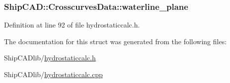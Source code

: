 \subsubsection[{\texorpdfstring{waterline\+\_\+plane}{waterline_plane}}]{ Ship\+C\+A\+D\+::\+Crosscurves\+Data\+::waterline\+\_\+plane}\hypertarget{structShipCAD_1_1CrosscurvesData_a1ea6de1b52289e8392e8d499ae4aad04}{}\label{structShipCAD_1_1CrosscurvesData_a1ea6de1b52289e8392e8d499ae4aad04}


Definition at line 92 of file hydrostaticcalc.\+h.



The documentation for this struct was generated from the following files\+:\begin{DoxyCompactItemize}
\item 
Ship\+C\+A\+Dlib/\hyperlink{hydrostaticcalc_8h}{hydrostaticcalc.\+h}\item 
Ship\+C\+A\+Dlib/\hyperlink{hydrostaticcalc_8cpp}{hydrostaticcalc.\+cpp}\end{DoxyCompactItemize}
